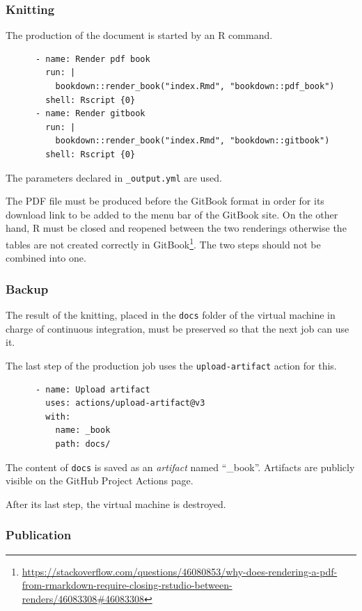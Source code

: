 \documentclass[
  12pt,
  american,
  a4paper,
  extrafontsizes,onecolumn,openright
  ]{memoir}
\newlength{\rf}
\begin{document}
\hypertarget{knitting}{%
\subsubsection{Knitting}\label{knitting}}

The production of the document is started by an R command.

\begin{verbatim}
      - name: Render pdf book
        run: |
          bookdown::render_book("index.Rmd", "bookdown::pdf_book")
        shell: Rscript {0}
      - name: Render gitbook
        run: |
          bookdown::render_book("index.Rmd", "bookdown::gitbook")
        shell: Rscript {0}
\end{verbatim}

The parameters declared in \texttt{\_output.yml} are used.

The PDF file must be produced before the GitBook format in order for its download link to be added to the menu bar of the GitBook site.
On the other hand, R must be closed and reopened between the two renderings otherwise the tables are not created correctly in GitBook\footnote{\url{https://stackoverflow.com/questions/46080853/why-does-rendering-a-pdf-from-rmarkdown-require-closing-rstudio-between-renders/46083308\#46083308}}.
The two steps should not be combined into one.

\hypertarget{backup}{%
\subsubsection{Backup}\label{backup}}

The result of the knitting, placed in the \texttt{docs} folder of the virtual machine in charge of continuous integration, must be preserved so that the next job can use it.

The last step of the production job uses the \texttt{upload-artifact} action for this.

\begin{verbatim}
      - name: Upload artifact
        uses: actions/upload-artifact@v3
        with:
          name: _book
          path: docs/
\end{verbatim}

The content of \texttt{docs} is saved as an \emph{artifact} named ``\_book''.
Artifacts are publicly visible on the GitHub Project Actions page.

After its last step, the virtual machine is destroyed.

\hypertarget{publication}{%
\subsubsection{Publication}\label{publication}}
\end{document}
